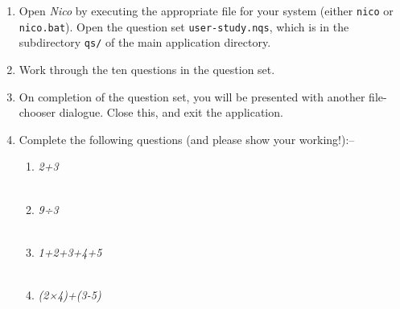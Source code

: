 \documentclass[14pt]{article}
\begin{document}
\begin{enumerate}

\item Open \emph{Nico} by executing the appropriate file for your system (either
\verb¬nico¬ or \verb¬nico.bat¬).  Open the question set
\verb¬user-study.nqs¬, which is in the subdirectory \verb¬qs/¬ of the main
application directory.

\item Work through the ten questions in the question set.

\item On completion of the question set, you will be presented with
another file-chooser dialogue.  Close this, and exit the application.

\item Complete the following questions (and please show your working!):--

\begin{enumerate}

\item \emph{2+3}\\

\fbox{
\begin{minipage}{16cm}
\hfill\vspace{3cm}
\end{minipage}
}\\

\pagebreak

\item \emph{9÷3}\\

\fbox{
\begin{minipage}{16cm}
\hfill\vspace{3cm}
\end{minipage}
}\\

\item \emph{1+2+3+4+5}\\

\fbox{
\begin{minipage}{16cm}
\hfill\vspace{3cm}
\end{minipage}
}\\

\item \emph{(2×4)+(3-5)}\\

\fbox{
\begin{minipage}{16cm}
\hfill\vspace{3cm}
\end{minipage}
}\\


\end{enumerate}
\end{enumerate}
\end{document}
